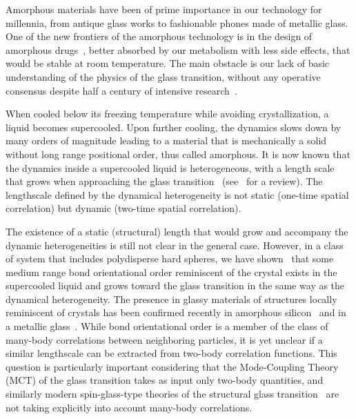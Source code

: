 \documentclass[twocolumn,superscriptaddress]{revtex4}
\begin{document}
Amorphous materials have been of prime importance in our technology for millennia, from antique glass works to fashionable phones made of metallic glass. One of the new frontiers of the amorphous technology is in the design of amorphous drugs~\cite{Petit2006,Grzybowska2012}, better absorbed by our metabolism with less side effects, that would be stable at room temperature. The main obstacle is our lack of basic understanding of the physics of the glass transition, without any operative consensus despite half a century of intensive research~\citep{cavagna2009supercooled,BerthierR}.

When cooled below its freezing temperature while avoiding crystallization, a liquid becomes supercooled. Upon further cooling, the dynamics slows down by many orders of magnitude leading to a material that is mechanically a solid without long range positional order, thus called amorphous. It is now known that the dynamics inside a supercooled liquid is heterogeneous, with a length scale that grows when approaching the glass transition~\citep{yamamoto1998,Donati1999a} (see~\citep{BerthierR} for a review). The lengthscale defined by the dynamical heterogeneity is not static (one-time spatial correlation) but dynamic (two-time spatial correlation).

The existence of a static (structural) length that would grow and accompany the dynamic heterogeneities is still not clear in the general case. However, in a class of system that includes polydisperse hard spheres, we have shown~\cite{tanaka} that some medium range bond orientational order reminiscent of the crystal exists in the supercooled liquid and grows toward the glass transition in the same way as the dynamical heterogeneity. The presence in glassy materials of structures locally reminiscent of crystals has been confirmed recently in amorphous silicon~\cite{Treacy2012} and in a metallic glass~\cite{Hwang2012}. While bond orientational order is a member of the class of many-body
correlations between neighboring particles, it is yet unclear if a similar lengthscale can be extracted
from two-body correlation functions.
This question is particularly important considering that the Mode-Coupling Theory (MCT) of the glass transition takes as input only two-body quantities, and
similarly modern spin-glass-type theories of the structural glass transition~\cite{lubchenko2007,Biroli2008,Parisi2010} are not taking explicitly into account many-body correlations.
\end{document}
